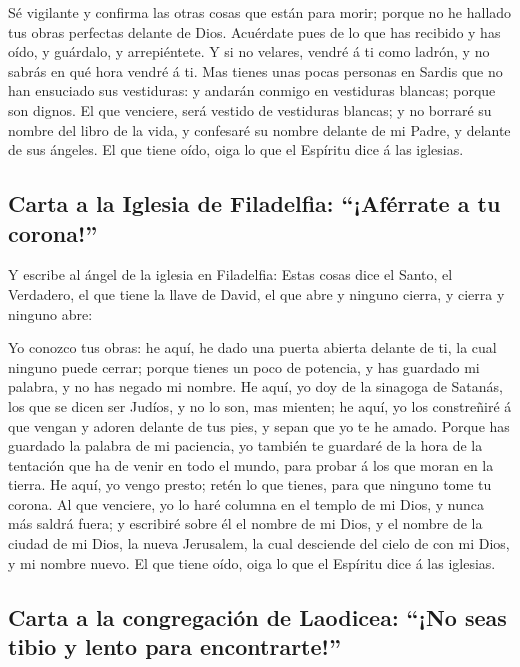  Sé vigilante y confirma las otras cosas que están para
morir; porque no he hallado tus obras perfectas delante de Dios.
 Acuérdate pues de lo que has recibido y has oído, y
guárdalo, y arrepiéntete. Y si no velares, vendré á ti como ladrón, y no
sabrás en qué hora vendré á ti.  Mas tienes unas pocas
personas en Sardis que no han ensuciado sus vestiduras: y andarán
conmigo en vestiduras blancas; porque son dignos.  El que
venciere, será vestido de vestiduras blancas; y no borraré su nombre del
libro de la vida, y confesaré su nombre delante de mi Padre, y delante
de sus ángeles.  El que tiene oído, oiga lo que el Espíritu
dice á las iglesias.

\hypertarget{carta-a-la-iglesia-de-filadelfia-afuxe9rrate-a-tu-corona}{%
\subsection{Carta a la Iglesia de Filadelfia: ``¡Aférrate a tu
corona!''}\label{carta-a-la-iglesia-de-filadelfia-afuxe9rrate-a-tu-corona}}

 Y escribe al ángel de la iglesia en Filadelfia: Estas cosas
dice el Santo, el Verdadero, el que tiene la llave de David, el que abre
y ninguno cierra, y cierra y ninguno abre:

 Yo conozco tus obras: he aquí, he dado una puerta abierta
delante de ti, la cual ninguno puede cerrar; porque tienes un poco de
potencia, y has guardado mi palabra, y no has negado mi nombre.
 He aquí, yo doy de la sinagoga de Satanás, los que se dicen
ser Judíos, y no lo son, mas mienten; he aquí, yo los constreñiré á que
vengan y adoren delante de tus pies, y sepan que yo te he amado.
 Porque has guardado la palabra de mi paciencia, yo también
te guardaré de la hora de la tentación que ha de venir en todo el mundo,
para probar á los que moran en la tierra.  He aquí, yo
vengo presto; retén lo que tienes, para que ninguno tome tu corona.
 Al que venciere, yo lo haré columna en el templo de mi
Dios, y nunca más saldrá fuera; y escribiré sobre él el nombre de mi
Dios, y el nombre de la ciudad de mi Dios, la nueva Jerusalem, la cual
desciende del cielo de con mi Dios, y mi nombre nuevo.  El
que tiene oído, oiga lo que el Espíritu dice á las iglesias.

\hypertarget{carta-a-la-congregaciuxf3n-de-laodicea-no-seas-tibio-y-lento-para-encontrarte}{%
\subsection{Carta a la congregación de Laodicea: ``¡No seas tibio y
lento para
encontrarte!''}\label{carta-a-la-congregaciuxf3n-de-laodicea-no-seas-tibio-y-lento-para-encontrarte}}

